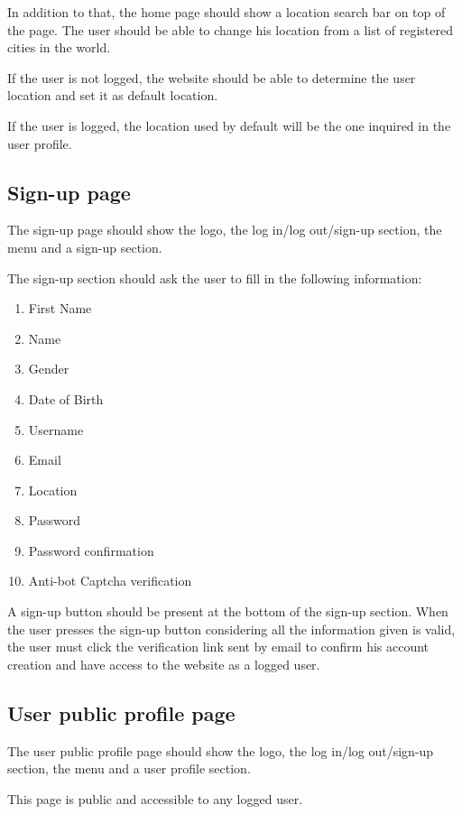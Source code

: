 \documentclass[conference]{IEEEtran}
\begin{document}
In addition to that, the home page should show a location search bar on top of the page. 
The user should be able to change his location from a list of registered cities in the world.

If the user is not logged, the website should be able to determine the user location and set it as default location.

If the user is logged, the location used by default will be the one inquired in the user profile.

\subsection{Sign-up page}

The sign-up page should show the logo, the log in/log out/sign-up section, the menu and a sign-up section.

The sign-up section should ask the user to fill in the following information:

\begin{enumerate}
    \item First Name
    \item Name
    \item Gender
    \item Date of Birth
    \item Username
    \item Email
    \item Location
    \item Password
    \item Password confirmation
    \item Anti-bot Captcha verification
\end{enumerate}

A sign-up button should be present at the bottom of the sign-up section. 
When the user presses the sign-up button considering all the information given is valid, the user must click the verification link sent by email to confirm his account creation and have access to the website as a logged user.

\subsection{User public profile page}

The user public profile page should show the logo, the log in/log out/sign-up section, the menu and a user profile section.

This page is public and accessible to any logged user.
\end{document}
